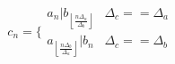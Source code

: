 \documentclass{article}
\begin{document}
\begin{titlepage}


\begin{equation*}
c_{n}= \{
\begin{array}{cc}
a_{n}|b_{ \left\lfloor  \frac{n\Delta _{a}}{\Delta _{b}} \right\rfloor }  & \Delta_{c}==\Delta _{a} \\
a_{ \left\lfloor  \frac {n\Delta _{b}}{\Delta _{a}} \right\rfloor }|b_{n} & \Delta_{c}==\Delta _{b}
\end{array}
\end{equation*}

\end{titlepage}
\end{document}
